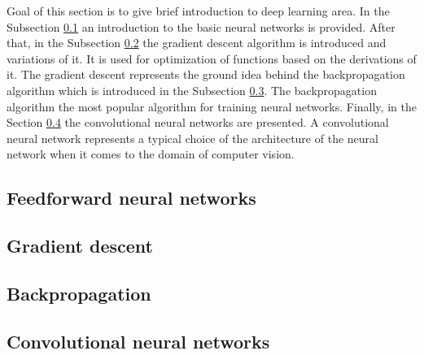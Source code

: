 Goal of this section is to give brief introduction to deep learning area. In the Subsection \ref{subsection:FNN} an introduction to the basic neural networks is provided. After that, in the Subsection \ref{subsection:gradient-descent} the gradient descent algorithm is introduced and variations of it. It is used for optimization of functions based on the derivations of it. The gradient descent represents the ground idea behind the backpropagation algorithm which is introduced in the Subsection \ref{subsection:backpropagation}. The backpropagation algorithm the most popular algorithm for training neural networks. Finally, in the Section \ref{subsection:convolutionalNN} the convolutional neural networks are presented. A convolutional neural network represents a typical choice of the architecture of the neural network when it comes to the domain of computer vision.

\subsection{Feedforward neural networks}
\label{subsection:FNN}


\subsection{Gradient descent}
\label{subsection:gradient-descent}


\subsection{Backpropagation}
\label{subsection:backpropagation}


\subsection{Convolutional neural networks}
\label{subsection:convolutionalNN}
